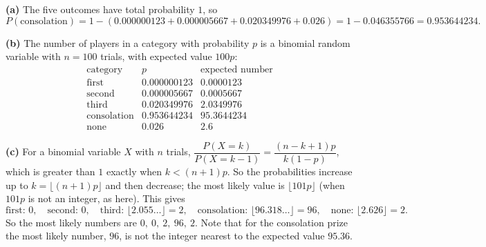 \textbf{(a)} The five outcomes have total probability $1$, so
\[
P(\text{consolation})=1-(0.000000123+0.000005667+0.020349976+0.026)=1-0.046355766=\boxed{0.953644234}.
\]

\textbf{(b)} The number of players in a category with probability $p$ is a binomial random variable with $n=100$ trials, with expected value $100p$:
\[
\begin{array}{l|c|c}
\text{category} & p & \text{expected number}\\\hline
\text{first} & 0.000000123 & 0.0000123\\
\text{second} & 0.000005667 & 0.0005667\\
\text{third} & 0.020349976 & 2.0349976\\
\text{consolation} & 0.953644234 & 95.3644234\\
\text{none} & 0.026 & 2.6
\end{array}
\]

\textbf{(c)} For a binomial variable $X$ with $n$ trials, $\dfrac{P(X=k)}{P(X=k-1)}=\dfrac{(n-k+1)p}{k(1-p)}$, which is greater than $1$ exactly when $k<(n+1)p$. So the probabilities increase up to $k=\lfloor(n+1)p\rfloor$ and then decrease; the most likely value is $\lfloor 101p\rfloor$ (when $101p$ is not an integer, as here). This gives
\[
\text{first: }0,\quad\text{second: }0,\quad\text{third: }\lfloor2.055\ldots\rfloor=2,\quad\text{consolation: }\lfloor96.318\ldots\rfloor=96,\quad\text{none: }\lfloor2.626\rfloor=2 .
\]
So the most likely numbers are $\boxed{0,\ 0,\ 2,\ 96,\ 2}$. Note that for the consolation prize the most likely number, $96$, is not the integer nearest to the expected value $95.36$.
